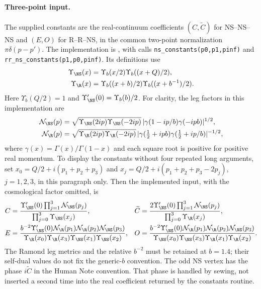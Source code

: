 \paragraph{Three-point input.}
The supplied constants are the real-continuum coefficients
$(C,\widetilde C)$ for NS--NS--NS and $(E,O)$ for R--R--NS,
in the common two-point normalization $\pi\delta(p-p')$.
The implementation is
,
with calls \texttt{ns\_constants(p0,p1,pinf)} and
\texttt{rr\_ns\_constants(p1,p0,pinf)}. Its definitions use
\begin{align}
 \Upsilon_{\NS}(x)&=\Upsilon_b(x/2)\Upsilon_b((x+Q)/2),\nonumber\\
 \Upsilon_{\R}(x)&=\Upsilon_b((x+b)/2)\Upsilon_b((x+b^{-1})/2).
 \label{eq:partition-upsilon}
\end{align}
Here $\Upsilon_b(Q/2)=1$ and
$\Upsilon'_{\NS}(0)=\Upsilon_b(b)/2$.
For clarity, the leg factors in this implementation are
\begin{align}
 \mathcal N_{\NS}(p)&=
 \sqrt{\Upsilon_{\NS}(2ip)\Upsilon_{\NS}(-2ip)}\,
 |\gamma(1-ip/b)\gamma(-ipb)|^{1/2},\nonumber\\
 \mathcal N_{\R}(p)&=
 \sqrt{\Upsilon_{\R}(2ip)\Upsilon_{\R}(-2ip)}\,
 |\gamma(\tfrac12+ipb)\gamma(\tfrac12+ip/b)|^{-1/2},
 \label{eq:partition-legs}
\end{align}
where $\gamma(x)=\Gamma(x)/\Gamma(1-x)$ and each square root is
positive for positive real momentum. To display the constants
without four repeated long arguments, set
$x_0=Q/2+i(p_1+p_2+p_3)$ and
$x_j=Q/2+i(p_1+p_2+p_3-2p_j)$, $j=1,2,3$, in this paragraph only.
Then the implemented input, with the cosmological factor omitted, is
\begin{align}
 C&=\frac{\Upsilon'_{\NS}(0)\prod_{j=1}^3\mathcal N_{\NS}(p_j)}
                {\prod_{j=0}^3\Upsilon_{\NS}(x_j)},&
 \widetilde C&=\frac{2\Upsilon'_{\NS}(0)\prod_{j=1}^3\mathcal N_{\NS}(p_j)}
                {\prod_{j=0}^3\Upsilon_{\R}(x_j)},\nonumber\\
 E&=\frac{b^{-2}\Upsilon'_{\NS}(0)
          \mathcal N_{\R}(p_1)\mathcal N_{\R}(p_2)\mathcal N_{\NS}(p_3)}
 {\Upsilon_{\R}(x_0)\Upsilon_{\R}(x_3)
  \Upsilon_{\NS}(x_1)\Upsilon_{\NS}(x_2)},&
 O&=\frac{b^{-2}\Upsilon'_{\NS}(0)
          \mathcal N_{\R}(p_1)\mathcal N_{\R}(p_2)\mathcal N_{\NS}(p_3)}
 {\Upsilon_{\NS}(x_0)\Upsilon_{\NS}(x_3)
  \Upsilon_{\R}(x_1)\Upsilon_{\R}(x_2)}.
 \label{eq:partition-constants}
\end{align}
The Ramond leg metrics and the relative $b^{-2}$ must be retained at
$b=1.4$; their self-dual values do not fix the generic-$b$ convention.
The odd NS vertex has the phase $i\widetilde C$ in the Human Note
convention. That phase is handled by sewing, not inserted a second
time into the real coefficient returned by the constants routine.

